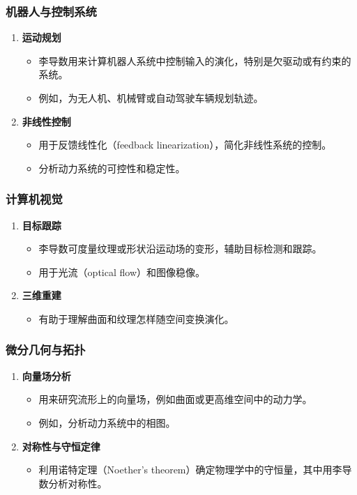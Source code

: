 \subsubsection{机器人与控制系统}
\begin{enumerate}[label=\alph*.]
  \item \textbf{运动规划}
  \begin{itemize}
    \item 李导数用来计算机器人系统中控制输入的演化，特别是欠驱动或有约束的系统。
    \item 例如，为无人机、机械臂或自动驾驶车辆规划轨迹。
  \end{itemize}
  \item \textbf{非线性控制}
  \begin{itemize}
    \item 用于反馈线性化（feedback linearization），简化非线性系统的控制。
    \item 分析动力系统的可控性和稳定性。
  \end{itemize}
\end{enumerate}

\subsubsection{计算机视觉}
\begin{enumerate}[label=\alph*.]
  \item \textbf{目标跟踪}
  \begin{itemize}
    \item 李导数可度量纹理或形状沿运动场的变形，辅助目标检测和跟踪。
    \item 用于光流（optical flow）和图像稳像。
  \end{itemize}
  \item \textbf{三维重建}
  \begin{itemize}
    \item 有助于理解曲面和纹理怎样随空间变换演化。
  \end{itemize}
\end{enumerate}

\subsubsection{微分几何与拓扑}
\begin{enumerate}[label=\alph*.]
  \item \textbf{向量场分析}
  \begin{itemize}
    \item 用来研究流形上的向量场，例如曲面或更高维空间中的动力学。
    \item 例如，分析动力系统中的相图。
  \end{itemize}
  \item \textbf{对称性与守恒定律}
  \begin{itemize}
    \item 利用诺特定理（Noether's theorem）确定物理学中的守恒量，其中用李导数分析对称性。
  \end{itemize}
\end{enumerate}

